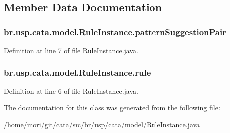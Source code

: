 \subsection{Member Data Documentation}
\hypertarget{classbr_1_1usp_1_1cata_1_1model_1_1_rule_instance_a1687392d0d1e1c5d1e7365420b4927f6}{
\subsubsection[{pattern\+Suggestion\+Pair}]{ br.\+usp.\+cata.\+model.\+Rule\+Instance.\+pattern\+Suggestion\+Pair\hspace{0.3cm}{\ttfamily [private]}}}\label{classbr_1_1usp_1_1cata_1_1model_1_1_rule_instance_a1687392d0d1e1c5d1e7365420b4927f6}


Definition at line 7 of file Rule\+Instance.\+java.

\hypertarget{classbr_1_1usp_1_1cata_1_1model_1_1_rule_instance_aed7bee122f42905f2320fc01eeb3a93a}{
\subsubsection[{rule}]{ br.\+usp.\+cata.\+model.\+Rule\+Instance.\+rule\hspace{0.3cm}{\ttfamily [private]}}}\label{classbr_1_1usp_1_1cata_1_1model_1_1_rule_instance_aed7bee122f42905f2320fc01eeb3a93a}


Definition at line 6 of file Rule\+Instance.\+java.



The documentation for this class was generated from the following file\+:\begin{DoxyCompactItemize}
\item 
/home/mori/git/cata/src/br/usp/cata/model/\hyperlink{_rule_instance_8java}{Rule\+Instance.\+java}\end{DoxyCompactItemize}
